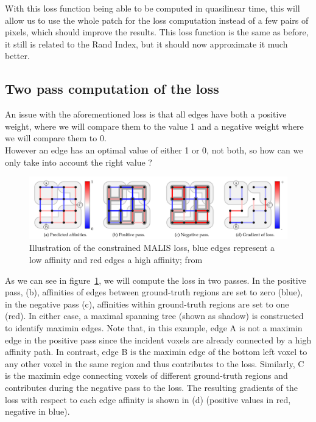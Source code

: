 With this loss function being able to be computed in quasilinear time, this
will allow us to use the whole patch for the loss computation instead of a few
pairs of pixels, which should improve the results. This loss function is the
same as before, it still is related to the Rand Index, but it should now
approximate it much better.\\

\subsection{Two pass computation of the loss}

An issue with the aforementioned loss is that all edges have both a positive
weight, where we will compare them to the value 1 and a negative weight where
we will compare them to 0.\\

However an edge has an optimal value of either 1 or 0, not both, so how can we
only take into account the right value ?

\begin{figure}[!htpb]
	\centering
	\includegraphics[width=1\linewidth]{./images/two_pass.png}
	\caption{Illustration of the constrained MALIS loss, blue edges represent a
	low affinity and red edges a high affinity; from~\cite{funke_large_2019}}%
	\label{fig:two-pass}
\end{figure}

As we can see in figure~\ref{fig:two-pass}, we will compute the loss in two
passes.
In the positive pass, (b), affinities of edges between ground-truth regions are
set to zero (blue), in the negative pass (c), affinities within ground-truth
regions are set to one (red). In either case, a maximal spanning tree (shown as
shadow) is constructed to identify maximin edges. Note that, in this example,
edge A is not a maximin edge in the positive pass since the incident voxels are
already connected by a high affinity path. In contrast, edge B is the maximin
edge of the bottom left voxel to any other voxel in the same region and thus
contributes to the loss. Similarly, C is the maximin edge connecting voxels of
different ground-truth regions and contributes during the negative pass to the
loss. The resulting gradients of the loss with respect to each edge affinity is
shown in (d) (positive values in red, negative in blue).\\


